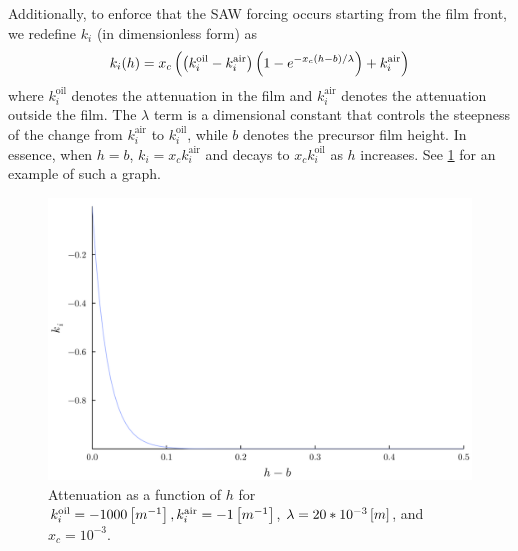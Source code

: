 Additionally, to enforce that the SAW forcing occurs starting from the film front, we redefine 
$k_i$ (in dimensionless form) as 
\begin{align}
    k_i\!\left( h \right) = x_c \left( \left( k_i^{\text{oil}} - k_i^{\text{air}} \right)\left( 1 - e^{-x_c(h-b)/\lambda} \right) + k_i^{\text{air}} \right)
    \label{eq:k_i}
\end{align}
where $k_i^{\text{oil}}$ denotes the attenuation in the film and $k_i^{\text{air}}$ denotes the attenuation
outside the film. The $\lambda$ term is a dimensional constant that controls the steepness of the change from $k_i^{\text{air}}$ to $k_i^{\text{oil}}$, 
while $b$ denotes the precursor film height. In essence, when $h = b$, $k_i = x_c k_i^{\text{air}}$ and  
decays to $x_c k_i^{\text{oil}}$ as $h$ increases. See \cref{fig:attenuation} for an example of such a graph. 

\begin{figure}[ht]
    \centering
    \includegraphics[scale=0.25]{images/attenuation.png}
    \caption{Attenuation as a function of $h$ for $k_i^{\text{oil}} = -1000 \left[ m^{-1} \right], k_i^{\text{air}} = -1 \left[ m^{-1} \right]$, 
    $\lambda = 20*10^{-3} \left[ m \right]$, and $x_c = 10^{-3}$.} 
    \label{fig:attenuation}
\end{figure}